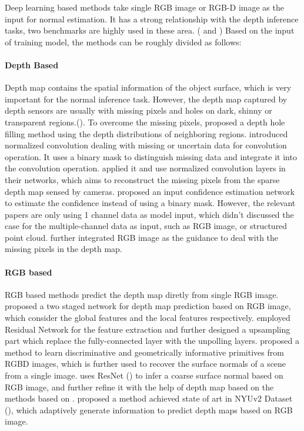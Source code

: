 Deep learning based methods take single RGB image or RGB-D image as the input for normal estimation. It has a strong relationship with the depth inference tasks, two benchmarks are highly used in these area. (\cite{nyu} and \cite{kitti-depth}) Based on the input of training model, the methods can be roughly divided as follows: 

\paragraph{Depth Based}
Depth map contains the spatial information of the object surface, which is very important for the normal inference task. However, the depth map captured by depth sensors are usually with missing pixels and holes on dark, shinny or transparent regions.(\cite{nyu}). To overcome the missing pixels,
\cite{depth-inpainting-distribution} proposed a depth hole filling method using the depth distributions of neighboring regions.  \cite{nconv} introduced normalized convolution dealing with missing or uncertain data for convolution operation. It uses a binary mask to distinguish missing data and integrate it into the convolution operation. \cite{ncnn} applied it and use normalized convolution layers in their networks, which aims to reconstruct the missing pixels from the sparse depth map sensed by cameras. \cite{pncnn} proposed an input confidence estimation network to estimate the confidence instead of using a binary mask. However, the relevant papers are only using 1 channel data as model input, which didn't discussed the case for the multiple-channel data as input, such as RGB image, or structured point cloud.
\cite{depth-enhance-guided} further integrated RGB image as the guidance to deal with the missing pixels in the depth map. 


\paragraph{RGB based} RGB based methods predict the depth map diretly from single RGB image.
\cite{Eigen} proposed a two staged network for depth map prediction based on RGB image, which consider the global features and the local features respectively. \cite{img2depth} employed Residual Network for the feature extraction and further designed a upsampling part which replace the fully-connected layer with the unpolling layers. 
\cite{geometry_based_solution} proposed a method to learn discriminative and geometrically informative primitives from RGBD images, which is further used to recover the surface normals of a scene from a single image. 
\cite{GeoNet} uses ResNet (\cite{resnet}) to infer a coarse surface normal based on RGB image, and further refine it with the help of depth map based on the methods based on \cite{geometry_based_solution}. \cite{binsformer} proposed a method achieved state of art in NYUv2 Dataset (\cite{nyu}), which adaptively generate information to predict depth maps based on RGB image.

